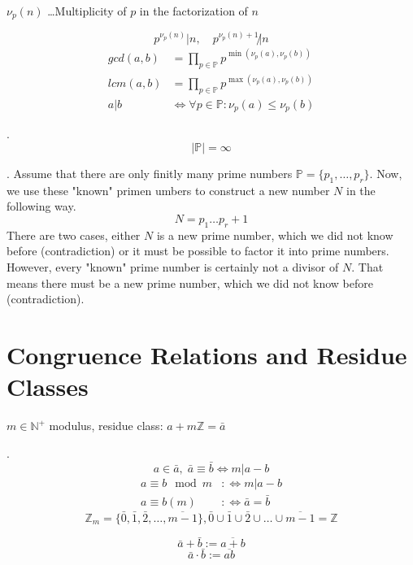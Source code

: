 $\nu_p(n)$ \ldots Multiplicity of $p$ in the factorization of $n$

\[
  p^{\nu_p(n)} | n, \quad p^{\nu_p(n)+1} \not| n
\]
\begin{align*}
  gcd(a,b) &= \prod_{p \in \mathbb{P}} p ^{\min(\nu_p(a), \nu_p(b))} \\
  lcm(a,b) &= \prod_{p \in \mathbb{P}} p ^{\max(\nu_p(a), \nu_p(b))} \\
  a|b &\iff \forall p \in \mathbb{P} : \nu_p(a) \leq \nu_p(b)
\end{align*}

\Theorem.
\[
  | \mathbb{P} | = \infty
\]

\Proof.
Assume that there are only finitly many prime numbers $\mathbb{P} = \{p_1, \ldots , p_r\}$. Now, we use these "known" primen umbers to construct a new number $N$ in the following way. 
\[
	N = p_1 \ldots p_r + 1 
\]
There are two cases, either $N$ is a new prime number, which we did not know before (contradiction) or it must be possible to factor it into prime numbers. However, every "known" prime number is certainly not a divisor of $N$. That means there must be a new prime number, which we did not know before (contradiction).

\section{Congruence Relations and Residue Classes}

\begin{definition}
$m \in \mathbb{N}^{+}$ modulus,
residue class: $a+m \mathbb{Z} = \bar{a}$
\end{definition}

\Remark.
\[
  a\in \bar{a},\; \bar{a} \equiv \bar{b} \iff m | a-b
\]
\begin{align*}
  a \equiv b \mod m & :\iff m | a-b \\
  a \equiv b (m)     & :\iff \bar{a} = \bar{b}
\end{align*}
\[
  \mathbb{Z}_m = \{ \bar{0},\bar{1},\bar{2}, \ldots, \overline{m-1}\} ,
  \bar{0} \cup \bar{1} \cup \bar{2} \cup  \ldots \cup \overline{m-1} = \mathbb{Z}
\]


\begin{definition}
\[
  \bar{a} + \bar{b} := \overline{a+b}
\]
\[
  \bar{a} \cdot \bar{b} := \overline{ab}
\]
\end{definition}

